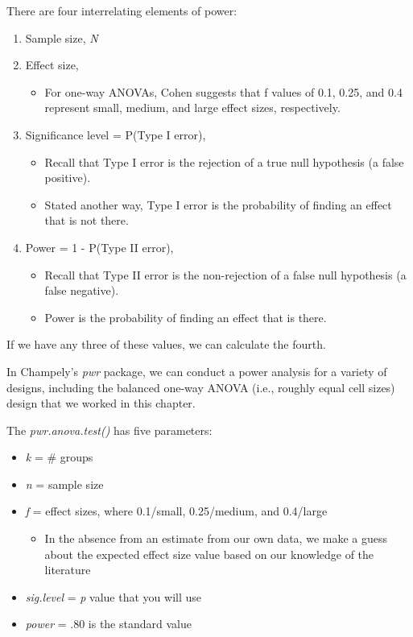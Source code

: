 \documentclass[
  11pt,
]{book}
\providecommand{\tightlist}{%
  \setlength{\itemsep}{0pt}\setlength{\parskip}{0pt}}
\begin{document}
There are four interrelating elements of power:

\begin{enumerate}
\def\labelenumi{\arabic{enumi}.}
\tightlist
\item
  Sample size, \emph{N}
\item
  Effect size,

  \begin{itemize}
  \tightlist
  \item
    For one-way ANOVAs, Cohen suggests that f values of 0.1, 0.25, and 0.4 represent small, medium, and large effect sizes, respectively.
  \end{itemize}
\item
  Significance level = P(Type I error),

  \begin{itemize}
  \tightlist
  \item
    Recall that Type I error is the rejection of a true null hypothesis (a false positive).
  \item
    Stated another way, Type I error is the probability of finding an effect that is not there.
  \end{itemize}
\item
  Power = 1 - P(Type II error),

  \begin{itemize}
  \tightlist
  \item
    Recall that Type II error is the non-rejection of a false null hypothesis (a false negative).
  \item
    Power is the probability of finding an effect that is there.
  \end{itemize}
\end{enumerate}

If we have any three of these values, we can calculate the fourth.

In Champely's \emph{pwr} package, we can conduct a power analysis for a variety of designs, including the balanced one-way ANOVA (i.e., roughly equal cell sizes) design that we worked in this chapter.

The \emph{pwr.anova.test()} has five parameters:

\begin{itemize}
\tightlist
\item
  \emph{k} = \# groups
\item
  \emph{n} = sample size
\item
  \emph{f} = effect sizes, where 0.1/small, 0.25/medium, and 0.4/large

  \begin{itemize}
  \tightlist
  \item
    In the absence from an estimate from our own data, we make a guess about the expected effect size value based on our knowledge of the literature
  \end{itemize}
\item
  \emph{sig.level} = \emph{p} value that you will use
\item
  \emph{power} = .80 is the standard value
\end{itemize}
\end{document}
